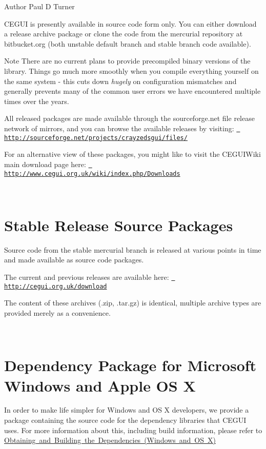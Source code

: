 \begin{DoxyAuthor}{Author}
Paul D Turner
\end{DoxyAuthor}
C\+E\+G\+UI is presently available in source code form only. You can either download a release archive package or clone the code from the mercurial repository at bitbucket.\+org (both unstable default branch and stable branch code available). \begin{DoxyNote}{Note}
There are no current plans to provide precompiled binary versions of the library. Things go much more smoothly when you compile everything yourself on the same system -\/ this cuts down {\itshape hugely} on configuration mismatches and generally prevents many of the common user errors we have encountered multiple times over the years.
\end{DoxyNote}
All released packages are made available through the sourceforge.\+net file release network of mirrors, and you can browse the available releases by visiting\+: \href{http://sourceforge.net/projects/crayzedsgui/files/}{\texttt{ http\+://sourceforge.\+net/projects/crayzedsgui/files/}}

For an alternative view of these packages, you might like to visit the C\+E\+G\+U\+I\+Wiki main download page here\+: \href{http://www.cegui.org.uk/wiki/index.php/Downloads}{\texttt{ http\+://www.\+cegui.\+org.\+uk/wiki/index.\+php/\+Downloads}}

~\newline
 \hypertarget{downloading_dl_src_releases}{}\section{Stable Release Source Packages}\label{downloading_dl_src_releases}
Source code from the stable mercurial branch is released at various points in time and made available as source code packages.

The current and previous releases are available here\+: \href{http://cegui.org.uk/download}{\texttt{ http\+://cegui.\+org.\+uk/download}}

The content of these archives (.zip, .tar.\+gz) is identical, multiple archive types are provided merely as a convenience.

~\newline
 \hypertarget{downloading_dl_deps}{}\section{Dependency Package for Microsoft Windows and Apple O\+S X}\label{downloading_dl_deps}
In order to make life simpler for Windows and OS X developers, we provide a package containing the source code for the dependency libraries that C\+E\+G\+UI uses. For more information about this, including build information, please refer to \mbox{\hyperlink{building_deps}{Obtaining and Building the Dependencies (Windows and OS X)}}

